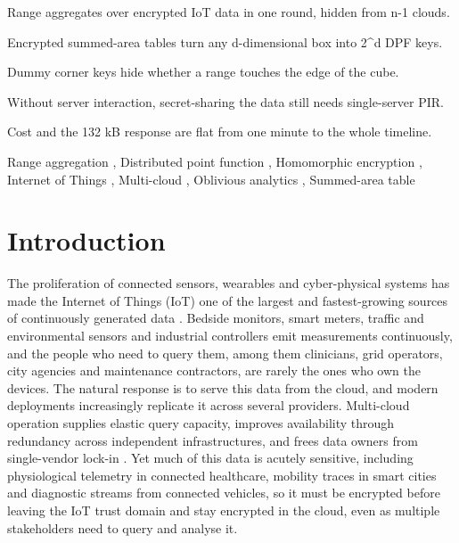 \documentclass[a4paper,fleqn]{cas-sc}
\newif\ifanonymous
\begin{document}
\ifanonymous\else
\begin{highlights}
\item Range aggregates over encrypted IoT data in one round, hidden from n-1
      clouds.
\item Encrypted summed-area tables turn any d-dimensional box into 2^d DPF
      keys.
\item Dummy corner keys hide whether a range touches the edge of the cube.
\item Without server interaction, secret-sharing the data still needs
      single-server PIR.
\item Cost and the 132 kB response are flat from one minute to the whole
      timeline.
\end{highlights}
\fi

\begin{keywords}
Range aggregation \sep
Distributed point function \sep
Homomorphic encryption \sep
Internet of Things \sep
Multi-cloud \sep
Oblivious analytics \sep
Summed-area table
\end{keywords}

\maketitle

\section{Introduction}
\label{sec:intro}

The proliferation of connected sensors, wearables and cyber-physical systems
has made the Internet of Things (IoT) one of the largest and fastest-growing
sources of continuously generated data \citep{atzori2010internet}. Bedside
monitors, smart meters, traffic and environmental sensors and industrial
controllers emit measurements continuously, and the people who need to query
them, among them clinicians, grid operators, city agencies and maintenance
contractors, are rarely the ones who own the devices. The natural response is
to serve this data from the cloud, and modern deployments increasingly
replicate it across several providers. Multi-cloud operation supplies elastic
query capacity, improves availability through redundancy across independent
infrastructures, and frees data owners from single-vendor lock-in
\citep{petcu2013multicloud,grozev2014intercloud}. Yet much of this data is
acutely sensitive, including physiological telemetry in connected healthcare,
mobility traces in smart cities and diagnostic streams from connected
vehicles, so it must be encrypted before leaving the IoT trust domain and stay
encrypted in the cloud, even as multiple stakeholders need to query and
analyse it.
\end{document}
